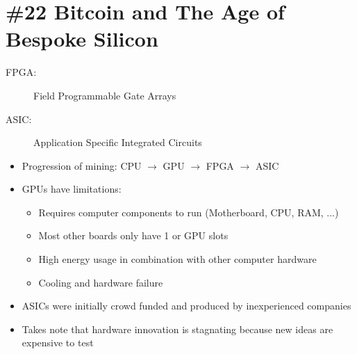 \section{\#22 Bitcoin and The Age of Bespoke Silicon}
\begin{description}
	\item[FPGA:] Field Programmable Gate Arrays
	\item[ASIC:] Application Specific Integrated Circuits
\end{description}
\begin{itemize}
	\item Progression of mining: CPU $\rightarrow$ GPU $\rightarrow$ FPGA $\rightarrow$ ASIC
	\item GPUs have limitations:
	\begin{itemize}
		\item Requires computer components to run (Motherboard, CPU, RAM, ...)
		\item Most other boards only have 1 or GPU slots
		\item High energy usage in combination with other computer hardware
		\item Cooling and hardware failure
	\end{itemize}
	\item ASICs were initially crowd funded and produced by inexperienced companies
	\item Takes note that hardware innovation is stagnating because new ideas are expensive to test
\end{itemize}